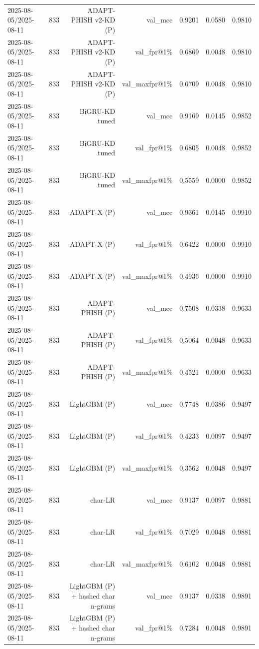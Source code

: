 \begin{table}[t]
\begin{tabular}{llrrrrr}
2025-08-05/2025-08-11 & 833 & ADAPT-PHISH v2-KD (P) & val\_mcc & 0.9201 & 0.0580 & 0.9810 \\
2025-08-05/2025-08-11 & 833 & ADAPT-PHISH v2-KD (P) & val\_fpr@1\% & 0.6869 & 0.0048 & 0.9810 \\
2025-08-05/2025-08-11 & 833 & ADAPT-PHISH v2-KD (P) & val\_maxfpr@1\% & 0.6709 & 0.0048 & 0.9810 \\
2025-08-05/2025-08-11 & 833 & BiGRU-KD tuned & val\_mcc & 0.9169 & 0.0145 & 0.9852 \\
2025-08-05/2025-08-11 & 833 & BiGRU-KD tuned & val\_fpr@1\% & 0.6805 & 0.0048 & 0.9852 \\
2025-08-05/2025-08-11 & 833 & BiGRU-KD tuned & val\_maxfpr@1\% & 0.5559 & 0.0000 & 0.9852 \\
2025-08-05/2025-08-11 & 833 & ADAPT-X (P) & val\_mcc & 0.9361 & 0.0145 & 0.9910 \\
2025-08-05/2025-08-11 & 833 & ADAPT-X (P) & val\_fpr@1\% & 0.6422 & 0.0000 & 0.9910 \\
2025-08-05/2025-08-11 & 833 & ADAPT-X (P) & val\_maxfpr@1\% & 0.4936 & 0.0000 & 0.9910 \\
2025-08-05/2025-08-11 & 833 & ADAPT-PHISH (P) & val\_mcc & 0.7508 & 0.0338 & 0.9633 \\
2025-08-05/2025-08-11 & 833 & ADAPT-PHISH (P) & val\_fpr@1\% & 0.5064 & 0.0048 & 0.9633 \\
2025-08-05/2025-08-11 & 833 & ADAPT-PHISH (P) & val\_maxfpr@1\% & 0.4521 & 0.0000 & 0.9633 \\
2025-08-05/2025-08-11 & 833 & LightGBM (P) & val\_mcc & 0.7748 & 0.0386 & 0.9497 \\
2025-08-05/2025-08-11 & 833 & LightGBM (P) & val\_fpr@1\% & 0.4233 & 0.0097 & 0.9497 \\
2025-08-05/2025-08-11 & 833 & LightGBM (P) & val\_maxfpr@1\% & 0.3562 & 0.0048 & 0.9497 \\
2025-08-05/2025-08-11 & 833 & char-LR & val\_mcc & 0.9137 & 0.0097 & 0.9881 \\
2025-08-05/2025-08-11 & 833 & char-LR & val\_fpr@1\% & 0.7029 & 0.0048 & 0.9881 \\
2025-08-05/2025-08-11 & 833 & char-LR & val\_maxfpr@1\% & 0.6102 & 0.0048 & 0.9881 \\
2025-08-05/2025-08-11 & 833 & LightGBM (P) + hashed char n-grams & val\_mcc & 0.9137 & 0.0338 & 0.9891 \\
2025-08-05/2025-08-11 & 833 & LightGBM (P) + hashed char n-grams & val\_fpr@1\% & 0.7284 & 0.0048 & 0.9891 \\

\end{tabular}
\end{table}
